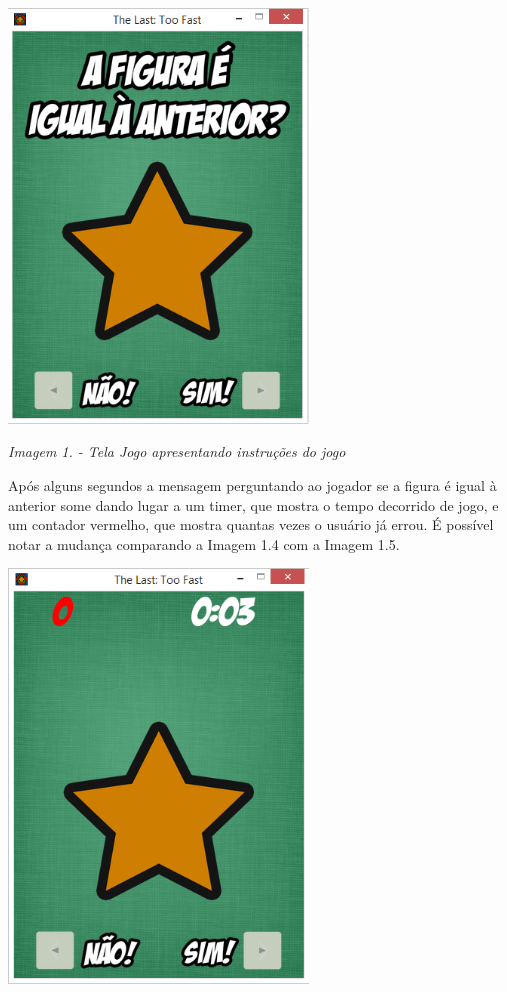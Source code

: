 \documentclass[a4paper]{article}
\newcounter{Imagem2}
\renewcommand\theImagem2{\arabic{Imagem2}}
\newcounter{Imagem1}
\renewcommand\theImagem1{\arabic{Imagem1}}
\begin{document}
\bigskip

{\centering 
\includegraphics[width=3.1362in,height=4.3307in]{T1-img5.png} \par}

{\centering\itshape\color[rgb]{0.26666668,0.32941177,0.41568628}
Imagem 1. \stepcounter{Imagem1}{\theImagem1} - Tela
{\textquotedbl}Jogo{\textquotedbl} apresentando instruções do jogo
\par}


\bigskip

Após alguns segundos a mensagem perguntando ao jogador se a figura é
igual à anterior some dando lugar a um timer, que mostra o tempo
decorrido de jogo, e um contador vermelho, que mostra quantas vezes o
usuário já errou. É possível notar a mudança comparando a Imagem 1.4
com a Imagem 1.5.

{\centering 
\includegraphics[width=3.1362in,height=4.3307in]{T1-img6.png} \par}
\end{document}

